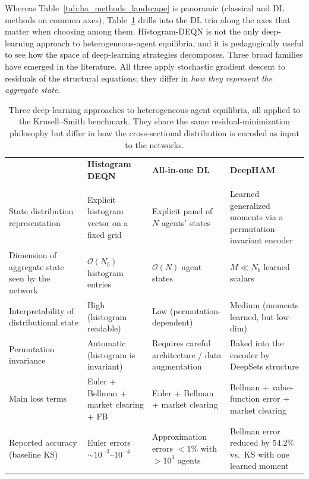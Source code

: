 \documentclass[11pt,a4paper]{report}
\begin{document}
Whereas Table~\ref{tab:ha_methods_landscape} is panoramic (classical and DL methods on common axes), Table~\ref{tab:ks_dl_comparison} drills into the DL trio along the axes that matter when choosing among them.  Histogram-DEQN is not the only deep-learning approach to heterogeneous-agent equilibria, and it is pedagogically useful to see how the space of deep-learning strategies decomposes.  Three broad families have emerged in the literature.  All three apply stochastic gradient descent to residuals of the structural equations; they differ in \emph{how they represent the aggregate state}.

\begin{table}[ht]
\centering
\small
\begin{tabular}{p{3.1cm} p{3.1cm} p{3.1cm} p{3.1cm}}
\toprule
 & \textbf{Histogram DEQN} & \textbf{All-in-one DL} & \textbf{DeepHAM} \\
 & \citep{azinovicDEEPEQUILIBRIUMNETS2022} & \citep{maliar2021deep} & \citep{han2023deepham} \\
\midrule
State distribution representation
 & Explicit histogram vector on a fixed grid
 & Explicit panel of $N$ agents' states
 & Learned generalized moments via a permutation-invariant encoder \\
\addlinespace
Dimension of aggregate state seen by the network
 & $\mathcal{O}(N_b)$ histogram entries
 & $\mathcal{O}(N)$ agent states
 & $M \ll N_b$ learned scalars \\
\addlinespace
Interpretability of distributional state
 & High (histogram readable)
 & Low (permutation-dependent)
 & Medium (moments learned, but low-dim) \\
\addlinespace
Permutation invariance
 & Automatic (histogram is invariant)
 & Requires careful architecture / data augmentation
 & Baked into the encoder by DeepSets structure \\
\addlinespace
Main loss terms
 & Euler + Bellman + market clearing + FB
 & Euler + Bellman + market clearing
 & Bellman + value-function error + market clearing \\
\addlinespace
Reported accuracy (baseline KS)
 & Euler errors $\sim 10^{-3}$--$10^{-4}$
 & Approximation errors $< 1\%$ with $>10^3$ agents
 & Bellman error reduced by $54.2\%$ vs.\ KS with one learned moment \\
\bottomrule
\end{tabular}
\caption{Three deep-learning approaches to heterogeneous-agent equilibria, all applied to the Krusell--Smith benchmark.  They share the same residual-minimization philosophy but differ in how the cross-sectional distribution is encoded as input to the networks.}
\label{tab:ks_dl_comparison}
\end{table}
\end{document}
